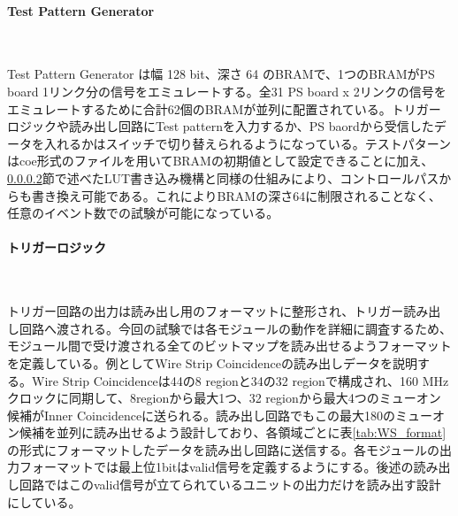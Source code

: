 \paragraph{Test Pattern Generator}　　
\par
Test Pattern Generator は幅 128 bit、深さ 64 のBRAMで、1つのBRAMがPS board 1リンク分の信号をエミュレートする。全31 PS board x 2リンクの信号をエミュレートするために合計62個のBRAMが並列に配置されている。トリガーロジックや読み出し回路にTest patternを入力するか、PS baordから受信したデータを入れるかはスイッチで切り替えられるようになっている。テストパターンはcoe形式のファイルを用いてBRAMの初期値として設定できることに加え、\ref{}節で述べたLUT書き込み機構と同様の仕組みにより、コントロールパスからも書き換え可能である。これによりBRAMの深さ64に制限されることなく、任意のイベント数での試験が可能になっている。

\paragraph{トリガーロジック}　　
\par
トリガー回路の出力は読み出し用のフォーマットに整形され、トリガー読み出し回路へ渡される。今回の試験では各モジュールの動作を詳細に調査するため、モジュール間で受け渡される全てのビットマップを読み出せるようフォーマットを定義している。例としてWire Strip Coincidenceの読み出しデータを説明する。Wire Strip Coincidenceは44の8 regionと34の32 regionで構成され、160 MHzクロックに同期して、8regionから最大1つ、32 regionから最大4つのミューオン候補がInner Coincidenceに送られる。読み出し回路でもこの最大180のミューオン候補を並列に読み出せるよう設計しており、各領域ごとに表\ref{tab:WS_format}の形式にフォーマットしたデータを読み出し回路に送信する。各モジュールの出力フォーマットでは最上位1bitはvalid信号を定義するようにする。後述の読み出し回路ではこのvalid信号が立てられているユニットの出力だけを読み出す設計にしている。

